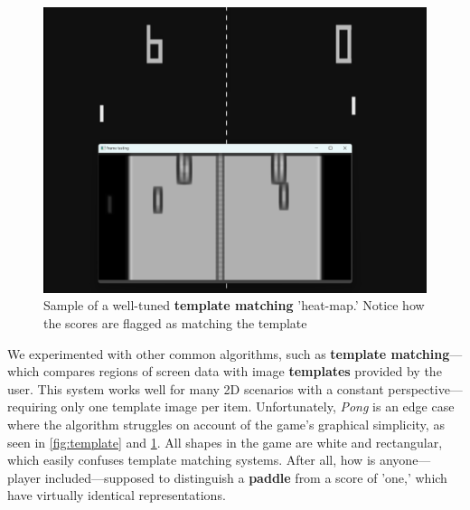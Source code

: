 \documentclass{report}
\newcommand{\pad}{\textbf{paddle}\xspace}
\newcommand{\tech}[1]{\textbf{#1}}
\begin{document}
\begin{figure}
    \centering
    \includegraphics[width=0.7\linewidth]{tempData.png}
    \caption{Sample of a well-tuned \tech{template matching} 'heat-map.' Notice how the scores are flagged as matching the template}
    \label{fig:tempData}
\end{figure}

We experimented with other common algorithms, such as \tech{template matching}---which compares regions of screen data with image \tech{templates} provided by the user. This system works well for many 2D scenarios with a constant perspective---requiring only one template image per item. Unfortunately, \emph{Pong} is an edge case where the algorithm struggles on account of the game's graphical simplicity, as seen in \cref{fig:template} and \cref{fig:tempData}. All shapes in the game are white and rectangular, which easily confuses template matching systems. After all, how is anyone---player included---supposed to distinguish a \pad from a score of 'one,' which have virtually identical representations.   
\end{document}
